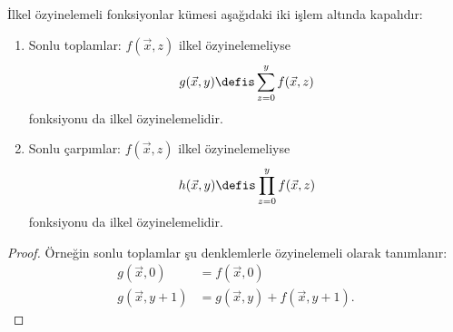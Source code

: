 \begin{prop}
İlkel özyinelemeli fonksiyonlar kümesi aşağıdaki iki işlem altında kapalıdır:
\begin{enumerate}
\item Sonlu toplamlar: $f(\vec x,z)$ ilkel özyinelemeliyse
\[
  g(\vec x,y)\defis\sum_{z=0}^{y}f(\vec x,z)
\]
fonksiyonu da ilkel özyinelemelidir.
\item Sonlu çarpımlar: $f(\vec x,z)$ ilkel özyinelemeliyse
\[
  h(\vec x,y)\defis\prod_{z=0}^{y}f(\vec x,z)
\]
fonksiyonu da ilkel özyinelemelidir.
\end{enumerate}
\end{prop}

\begin{proof}
Örneğin sonlu toplamlar şu denklemlerle özyinelemeli olarak tanımlanır:
\begin{align*}
  g(\vec x,0) & = f(\vec x,0)\\
  g(\vec x,y+1) & = g(\vec x,y)+f(\vec x,y+1).
\end{align*}
\end{proof}

